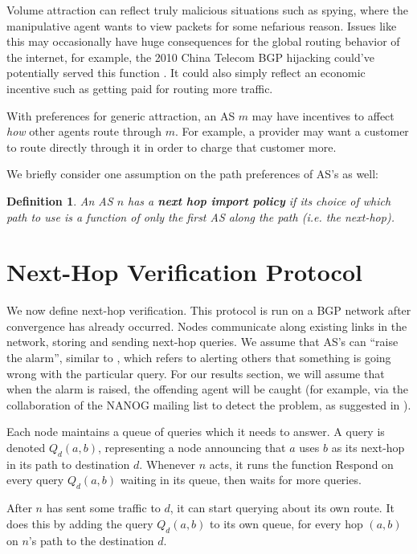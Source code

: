 \documentclass[10pt]{article}
\newtheorem{definition}{Definition}
\begin{document}
    Volume attraction can reflect truly malicious situations such as spying,
    where the manipulative agent wants to view packets for some nefarious
    reason. Issues like this may occasionally have huge consequences for the
    global routing behavior of the internet, for example, the 2010
    China Telecom BGP hijacking could've potentially served this function
    \cite{ChinaHijack}. It could also simply reflect an economic incentive such as
    getting paid for routing more traffic.

    With preferences for generic attraction, an AS $m$ may have incentives to affect
    \emph{how} other agents route through $m$.
    For example, a provider may want a customer to route directly through it
    in order to charge that customer more.

    We briefly consider one assumption on the path preferences of AS's as well:
    \begin{definition}
      An AS $n$ has a \textbf{next hop import policy} if its choice of which path to use
      is a function of only the first AS along the path (i.e. the next-hop).
    \end{definition}

\section{Next-Hop Verification Protocol}
  We now define next-hop verification.
  This protocol is run on a BGP network after convergence has already occurred.
  Nodes communicate along existing links in the network, storing and sending
  next-hop queries. We assume that AS's can ``raise the alarm'', similar to
  \cite{Attraction}, which refers to alerting others that something
  is going wrong with the particular query. For our results section,
  we will assume that when the alarm is raised, the offending agent will be
  caught (for example, via the collaboration of the NANOG mailing list to detect
  the problem, as suggested in \cite{Attraction}).

  Each node maintains a queue of queries which it needs to answer.
  A query is denoted $Q_d(a,b)$, representing a node announcing that
  $a$ uses $b$ as its next-hop in its path to destination $d$.
  Whenever $n$ acts, it runs the function {\sc Respond} on every query
  $Q_d(a,b)$ waiting in its queue, then waits for more queries.
  
  After $n$ has sent some traffic to $d$, it can start querying about its own
  route. It does this by adding the query $Q_d(a,b)$ to its own queue,
  for every hop $(a,b)$ on $n$'s path to the destination $d$.
\end{document}

